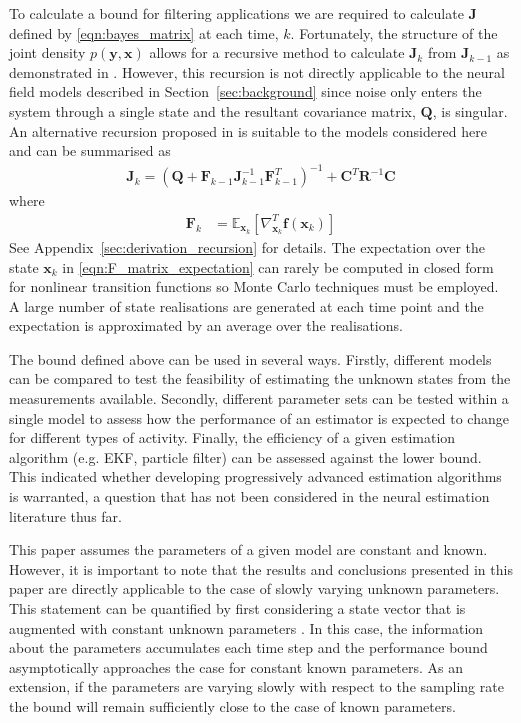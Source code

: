 \documentclass{article}
\renewcommand{\vec}[1]{\ensuremath{{\boldsymbol #1}}}
\newcommand{\mat}[1]{\ensuremath{\boldsymbol{#1}}}
\begin{document}
To calculate a bound for filtering applications we are required to calculate $\mat J$ defined by \eqref{eqn:bayes_matrix} at each time, $k$. Fortunately, the structure of the joint density $p(\vec y,\vec x)$ allows for a recursive method to calculate $\mat J_k$ from $\mat J_{k-1}$ as demonstrated in \cite{Tichavsky1998}. However, this recursion is not directly applicable to the neural field models described in Section~\ref{sec:background} since noise only enters the system through a single state and the resultant covariance matrix, $\mat Q$, is singular. An alternative recursion proposed in \cite{Bergman2001} is suitable to the models considered here and can be summarised as 
\begin{align}
	\mat J_k = \left( \mat Q + {\mat F}_{k-1} \mat J_{k-1}^{-1} {\mat F}_{k-1}^T\right)^{-1} + \mat C^T \mat R^{-1} \mat C
\end{align}
where
\begin{align}
		{\mat F}_k &= \mathbb E_{\vec x_k} \left[ \nabla_{\vec x_k}^T \vec f(\vec x_k)\right] 
		\label{eqn:F_matrix_expectation}
\end{align}
See Appendix~\ref{sec:derivation_recursion} for details. The expectation over the state $\vec x_k$ in \eqref{eqn:F_matrix_expectation} can rarely be computed in closed form for nonlinear transition functions so Monte Carlo techniques must be employed. A large number of state realisations are generated at each time point and the expectation is approximated by an average over the realisations.

The bound defined above can be used in several ways. Firstly, different models can be compared to test the feasibility of estimating the unknown states from the measurements available. Secondly, different parameter sets can be tested within a single model to assess how the performance of an estimator is expected to change for different types of activity. Finally, the efficiency of a given estimation algorithm (e.g. EKF, particle filter) can be assessed against the lower bound. This indicated whether developing progressively advanced estimation algorithms is warranted, a question that has not been considered in the neural estimation literature thus far.

This paper assumes the parameters of a given model are constant and known. However, it is important to note that the results and conclusions presented in this paper are directly applicable to the case of slowly varying unknown parameters. This statement can be quantified by first considering a state vector that is augmented with constant unknown parameters \cite{sdf}. In this case, the information about the parameters accumulates each time step and the performance bound asymptotically approaches the case for constant known parameters. As an extension, if the parameters are varying slowly with respect to the sampling rate the bound will remain sufficiently close to the case of known parameters.
\end{document}
